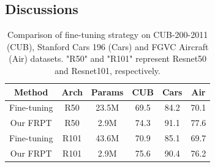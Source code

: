 \documentclass[letterpaper]{article} %
\begin{document}

\subsection{Discussions}



\begin{table}\centering

	\begin{tabular}{c|c|c||c|c|c}
		\hline
       \hline
       Method & Arch & Params & CUB & Cars & Air \\


		\hline
		\hline
		Fine-tuning & R50 & 23.5M & 69.5 & 84.2 & 70.1 \\
		Our FRPT  & R50 & 2.9M &74.3 & 91.1& 77.6\\
		Fine-tuning & R101 & 43.6M & 70.9 & 85.1 & 69.7 \\
		Our FRPT  & R101 & 2.9M &75.6 & 90.4& 76.2\\
		\hline
		\hline

\end{tabular}
	\caption{ Comparison of fine-tuning strategy on CUB-200-2011 (CUB),  Stanford Cars 196 (Cars) and FGVC Aircraft (Air) datasets.  "R50" and "R101" represent Resnet50 and Resnet101\cite{He2015Deep}, respectively. %
}
\end{table}
\end{document}
